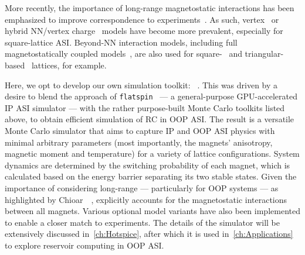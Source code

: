 More recently, the importance of long-range magnetostatic interactions has been emphasized to improve correspondence to experiments~\cite{Chioar2014,Rougemaille2011,Brunn2021}.
As such, vertex~\cite{gilbert2014emergent,Saglam2022Tetris,Goryca2021Plasma,MeltingASI} or hybrid NN/vertex charge~\cite{Canals2016,zhang2013crystallites} models have become more prevalent, especially for square-lattice ASI. %
Beyond-NN interaction models, including full magnetostatically coupled models~\cite{ApparentFMpinwheel,mengotti2011kagome}, are also used for square-~\cite{Brunn2021,Farhan2013,sklenar2019field} and triangular-based~\cite{Chioar2014,Rougemaille2011,Hofhuis2020} lattices, for example. \par %
Here, we opt to develop our own simulation toolkit: \hotspice~\cite{MAES-24}.
This was driven by a desire to blend the approach of \texttt{flatspin}~\cite{flatspin} --- a general-purpose GPU-accelerated IP ASI simulator --- with the rather purpose-built Monte Carlo toolkits listed above, to obtain efficient simulation of RC in OOP ASI.
The result is a versatile Monte Carlo simulator that aims to capture IP and OOP ASI physics with minimal arbitrary parameters (most importantly, the magnets' anisotropy, magnetic moment and temperature) for a variety of lattice configurations.
System dynamics are determined by the switching probability of each magnet, which is calculated based on the energy barrier separating its two stable states.
Given the importance of considering long-range  --- particularly for OOP systems --- as highlighted by Chioar~\etal~\cite{Chioar2014}, \hotspice{} explicitly accounts for the magnetostatic interactions between all magnets.
Various optional model variants have also been implemented to enable a closer match to experiments.
The details of the \hotspice simulator will be extensively discussed in~\cref{ch:Hotspice}, after which it is used in~\cref{ch:Applications} to explore reservoir computing in OOP ASI.
